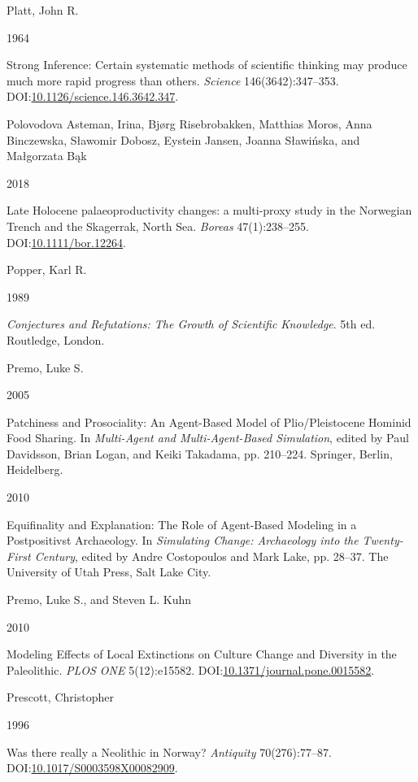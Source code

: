 \documentclass[
  12pt,
  a4paper,
  oneside]{book}
\newlength{\cslhangindent}
\newlength{\csllabelwidth}
\newlength{\cslentryspacingunit} %
\newenvironment{CSLReferences}[2] %
 {%
  \setlength{\parindent}{0pt}
  \ifodd #1
  \let\oldpar\par
  \def\par{\hangindent=\cslhangindent\oldpar}
  \fi
  \setlength{\parskip}{#2\cslentryspacingunit}
 }%
 {}
\newcommand{\CSLBlock}[1]{#1\hfill\break}
\newcommand{\CSLLeftMargin}[1]{\parbox[t]{\csllabelwidth}{#1}}
\newcommand{\CSLRightInline}[1]{\parbox[t]{\linewidth - \csllabelwidth}{#1}\break}
\begin{document}
\begin{CSLReferences}{0}{0}
\leavevmode{}%
\CSLBlock{Platt, John R.}
\CSLLeftMargin{ 1964}%
\CSLRightInline{{Strong Inference: Certain systematic methods of scientific thinking may produce much more rapid progress than others}. \emph{Science} 146(3642):347--353. DOI:\href{https://doi.org/10.1126/science.146.3642.347}{10.1126/science.146.3642.347}.}

\leavevmode{}%
\CSLBlock{Polovodova Asteman, Irina, Bjørg Risebrobakken, Matthias Moros, Anna Binczewska, Sławomir Dobosz, Eystein Jansen, Joanna Sławińska, and Małgorzata Bąk}
\CSLLeftMargin{ 2018}%
\CSLRightInline{{Late Holocene palaeoproductivity changes: a multi-proxy study in the Norwegian Trench and the Skagerrak, North Sea}. \emph{Boreas} 47(1):238--255. DOI:\href{https://doi.org/10.1111/bor.12264}{10.1111/bor.12264}.}

\leavevmode{}%
\CSLBlock{Popper, Karl R.}
\CSLLeftMargin{ 1989}%
\CSLRightInline{\emph{{Conjectures and Refutations: The Growth of Scientific Knowledge}}. 5th ed. Routledge, London.}

\leavevmode{}%
\CSLBlock{Premo, Luke S.}
\CSLLeftMargin{ 2005}%
\CSLRightInline{{Patchiness and Prosociality: An Agent-Based Model of Plio/Pleistocene Hominid Food Sharing}. In \emph{{Multi-Agent and Multi-Agent-Based Simulation}}, edited by Paul Davidsson, Brian Logan, and Keiki Takadama, pp. 210--224. Springer, Berlin, Heidelberg.}

\leavevmode{}%
\CSLLeftMargin{ 2010 }%
\CSLRightInline{{Equifinality and Explanation: The Role of Agent-Based Modeling in a Postpositivst Archaeology}. In \emph{{Simulating Change: Archaeology into the Twenty-First Century}}, edited by Andre Costopoulos and Mark Lake, pp. 28--37. The University of Utah Press, Salt Lake City.}

\leavevmode{}%
\CSLBlock{Premo, Luke S., and Steven L. Kuhn}
\CSLLeftMargin{ 2010}%
\CSLRightInline{{Modeling Effects of Local Extinctions on Culture Change and Diversity in the Paleolithic}. \emph{PLOS ONE} 5(12):e15582. DOI:\href{https://doi.org/10.1371/journal.pone.0015582}{10.1371/journal.pone.0015582}.}

\leavevmode{}%
\CSLBlock{Prescott, Christopher}
\CSLLeftMargin{ 1996}%
\CSLRightInline{{Was there really a Neolithic in Norway?} \emph{Antiquity} 70(276):77--87. DOI:\href{https://doi.org/10.1017/S0003598X00082909}{10.1017/S0003598X00082909}.}


\end{CSLReferences}
\end{document}

